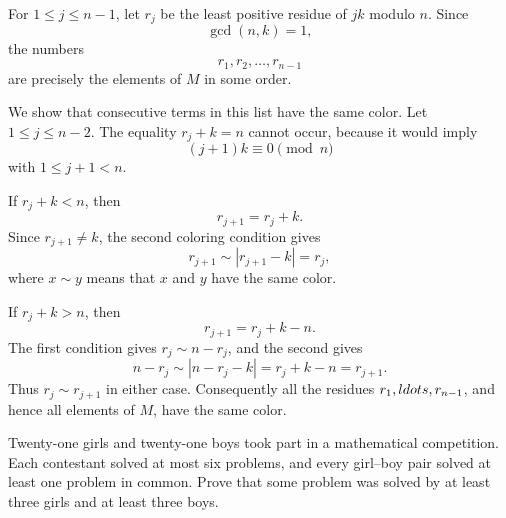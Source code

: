     \begin{solution}
        For $1\leq j\leq n-1$, let $r_j$ be the least positive residue of
        $jk$ modulo $n$. Since
        \[
            \gcd(n,k)=1,
        \]
        the numbers
        \[
            r_1,r_2,\ldots,r_{n-1}
        \]
        are precisely the elements of $M$ in some order.

        We show that consecutive terms in this list have the same color. Let
        $1\leq j\leq n-2$. The equality $r_j+k=n$ cannot occur, because it
        would imply
        \[
            (j+1)k\equiv0\pmod n
        \]
        with $1\leq j+1<n$.

        If $r_j+k<n$, then
        \[
            r_{j+1}=r_j+k.
        \]
        Since $r_{j+1}\neq k$, the second coloring condition gives
        \[
            r_{j+1}\sim|r_{j+1}-k|=r_j,
        \]
        where $x\sim y$ means that $x$ and $y$ have the same color.

        If $r_j+k>n$, then
        \[
            r_{j+1}=r_j+k-n.
        \]
        The first condition gives $r_j\sim n-r_j$, and the second gives
        \[
            n-r_j
            \sim
            |n-r_j-k|
            =r_j+k-n
            =r_{j+1}.
        \]
        Thus $r_j\sim r_{j+1}$ in either case. Consequently all the residues
        $r_1,\\ldots,r_{n-1}$, and hence all elements of $M$, have the same
        color.
    \end{solution}

    \begin{expectedproblem}[2001 IMO]
        Twenty-one girls and twenty-one boys took part in a mathematical
        competition. Each contestant solved at most six problems, and every
        girl--boy pair solved at least one problem in common. Prove that some
        problem was solved by at least three girls and at least three boys.
    \end{expectedproblem}

